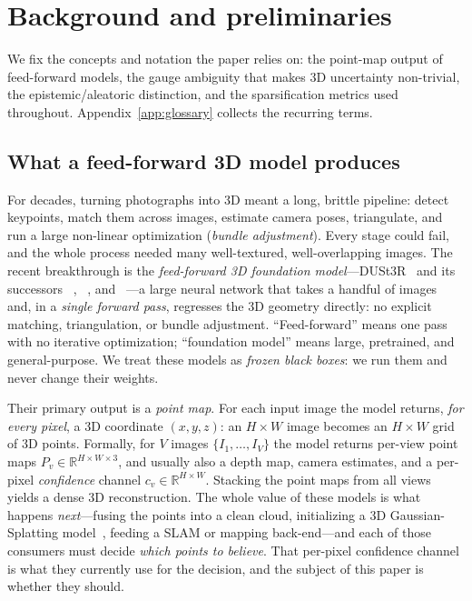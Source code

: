 \section{Background and preliminaries}
\label{sec:primer}

We fix the concepts and notation the paper relies on: the point-map output of feed-forward models,
the gauge ambiguity that makes 3D uncertainty non-trivial, the epistemic/aleatoric distinction, and
the sparsification metrics used throughout. Appendix~\ref{app:glossary} collects the recurring terms.

\subsection{What a feed-forward 3D model produces}
\label{sec:primer-pointmap}

For decades, turning photographs into 3D meant a long, brittle pipeline: detect keypoints, match
them across images, estimate camera poses, triangulate, and run a large non-linear optimization
(\emph{bundle adjustment}). Every stage could fail, and the whole process needed many well-textured,
well-overlapping images. The recent breakthrough is the \emph{feed-forward 3D foundation
model}---DUSt3R~\cite{dust3r} and its successors \mastr~\cite{mast3r}, \vggt~\cite{vggt}, and
\pii~\cite{pi3}---a large neural network that takes a handful of images and, in a \emph{single
forward pass}, regresses the 3D geometry directly: no explicit matching, triangulation, or bundle
adjustment. ``Feed-forward'' means one pass with no iterative optimization; ``foundation model''
means large, pretrained, and general-purpose. We treat these models as \emph{frozen black boxes}:
we run them and never change their weights.

Their primary output is a \emph{point map}. For each input image the model returns, \emph{for every
pixel}, a 3D coordinate $(x,y,z)$: an $H{\times}W$ image becomes an $H{\times}W$ grid of 3D points.
Formally, for $V$ images $\{I_1,\dots,I_V\}$ the model returns per-view point maps
$P_v \in \mathbb{R}^{H\times W\times 3}$, and usually also a depth map, camera estimates, and a
per-pixel \emph{confidence} channel $c_v \in \mathbb{R}^{H\times W}$. Stacking the point maps from
all views yields a dense 3D reconstruction. The whole value of these models is what happens
\emph{next}---fusing the points into a clean cloud, initializing a 3D Gaussian-Splatting
model~\cite{instantsplat,gsplat}, feeding a SLAM or mapping back-end---and each of those consumers
must decide \emph{which points to believe}. That per-pixel confidence channel is what they currently
use for the decision, and the subject of this paper is whether they should.

